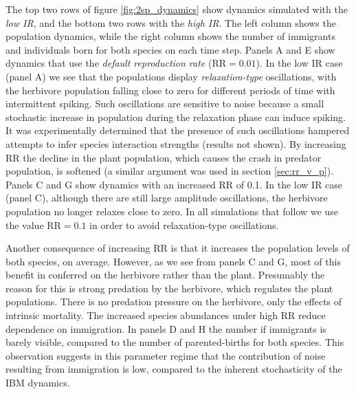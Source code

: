 The top two rows of figure \ref{fig:2sp_dynamics} show dynamics simulated with the \emph{low IR}, and the bottom two rows with the \emph{high IR}. The left column shows the population dynamics, while the right column shows the number of immigrants and individuals born for both species on each time step. Panels A and E show dynamics that use the \emph{default reproduction rate} (RR$=0.01$). In the low IR case (panel A) we see that the populations display \emph{relaxation-type} oscillations, with the herbivore population falling close to zero for different periods of time with intermittent spiking. Such oscillations are sensitive to noise because a small stochastic increase in population during the relaxation phase can induce spiking. It was experimentally determined that the presence of such oscillations hampered attempts to infer species interaction strengths (results not shown). By increasing RR the decline in the plant population, which causes the crash in predator population, is softened (a similar argument was used in section \ref{sec:rr_v_p}). Panels C and G show dynamics with an increased RR of 0.1. In the low IR case (panel C), although there are still large amplitude oscillations, the herbivore population no longer relaxes close to zero. In all simulations that follow we use the value RR$=0.1$ in order to avoid relaxation-type oscillations.

Another consequence of increasing RR is that it increases the population levels of both species, on average. However, as we see from panels C and G, most of this benefit in conferred on the herbivore rather than the plant. Presumably the reason for this is strong predation by the herbivore, which regulates the plant populations. There is no predation pressure on the herbivore, only the effects of intrinsic mortality. The increased species abundances under high RR reduce dependence on immigration. In panels D and H the number if immigrants is barely visible, compared to the number of parented-births for both species. This observation suggests in this parameter regime that the contribution of noise resulting from immigration is low, compared to the inherent stochasticity of the IBM dynamics.

